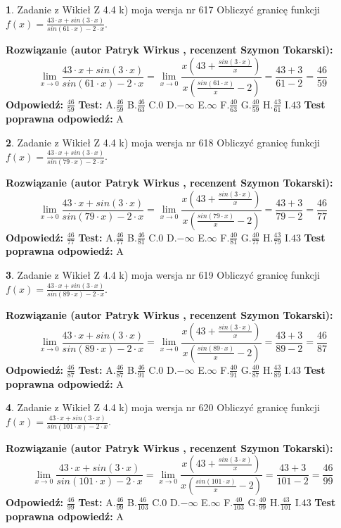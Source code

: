 \documentclass[12pt, a4paper]{article}
\theoremstyle{definition} %
\newtheorem{zad}{}
\newcommand{\zadStart}[1]{\begin{zad}#1\newline}
\newcommand{\zadStop}{\end{zad}}
\newcommand{\rozwStart}[2]{\noindent \textbf{Rozwiązanie (autor #1 , recenzent #2): }\newline}
\newcommand{\rozwStop}{\newline}
\newcommand{\odpStart}{\noindent \textbf{Odpowiedź:}\newline}
\newcommand{\odpStop}{\newline}
\newcommand{\testStart}{\noindent \textbf{Test:}\newline}
\newcommand{\testStop}{\newline}
\newcommand{\kluczStart}{\noindent \textbf{Test poprawna odpowiedź:}\newline}
\newcommand{\kluczStop}{\newline}
\begin{document}
\zadStart{Zadanie z Wikieł Z 4.4 k) moja wersja nr 617}
Obliczyć granicę funkcji $f(x)=\frac{43\cdot x +sin(3\cdot x)}{sin(61\cdot x) -2\cdot x}$.
\zadStop
\rozwStart{Patryk Wirkus}{Szymon Tokarski}
$$\lim\limits_{x\to 0}\frac{43\cdot x +sin(3\cdot x)}{sin(61\cdot x) -2\cdot x}
=\lim\limits_{x\to 0}\frac{x(43+\frac{sin(3\cdot x)}{x})}{x(\frac{sin(61\cdot x)}{x}-2)}
=\frac{43+3}{61-2} = \frac{46}{59}$$
\rozwStop
\odpStart
$\frac{46}{59}$
\odpStop
\testStart
A.$\frac{46}{59}$
B.$\frac{46}{63}$
C.$0$
D.$-\infty$
E.$\infty$
F.$\frac{40}{63}$
G.$\frac{40}{59}$
H.$\frac{43}{61}$
I.$43$
\testStop
\kluczStart
A
\kluczStop



\zadStart{Zadanie z Wikieł Z 4.4 k) moja wersja nr 618}
Obliczyć granicę funkcji $f(x)=\frac{43\cdot x +sin(3\cdot x)}{sin(79\cdot x) -2\cdot x}$.
\zadStop
\rozwStart{Patryk Wirkus}{Szymon Tokarski}
$$\lim\limits_{x\to 0}\frac{43\cdot x +sin(3\cdot x)}{sin(79\cdot x) -2\cdot x}
=\lim\limits_{x\to 0}\frac{x(43+\frac{sin(3\cdot x)}{x})}{x(\frac{sin(79\cdot x)}{x}-2)}
=\frac{43+3}{79-2} = \frac{46}{77}$$
\rozwStop
\odpStart
$\frac{46}{77}$
\odpStop
\testStart
A.$\frac{46}{77}$
B.$\frac{46}{81}$
C.$0$
D.$-\infty$
E.$\infty$
F.$\frac{40}{81}$
G.$\frac{40}{77}$
H.$\frac{43}{79}$
I.$43$
\testStop
\kluczStart
A
\kluczStop



\zadStart{Zadanie z Wikieł Z 4.4 k) moja wersja nr 619}
Obliczyć granicę funkcji $f(x)=\frac{43\cdot x +sin(3\cdot x)}{sin(89\cdot x) -2\cdot x}$.
\zadStop
\rozwStart{Patryk Wirkus}{Szymon Tokarski}
$$\lim\limits_{x\to 0}\frac{43\cdot x +sin(3\cdot x)}{sin(89\cdot x) -2\cdot x}
=\lim\limits_{x\to 0}\frac{x(43+\frac{sin(3\cdot x)}{x})}{x(\frac{sin(89\cdot x)}{x}-2)}
=\frac{43+3}{89-2} = \frac{46}{87}$$
\rozwStop
\odpStart
$\frac{46}{87}$
\odpStop
\testStart
A.$\frac{46}{87}$
B.$\frac{46}{91}$
C.$0$
D.$-\infty$
E.$\infty$
F.$\frac{40}{91}$
G.$\frac{40}{87}$
H.$\frac{43}{89}$
I.$43$
\testStop
\kluczStart
A
\kluczStop



\zadStart{Zadanie z Wikieł Z 4.4 k) moja wersja nr 620}
Obliczyć granicę funkcji $f(x)=\frac{43\cdot x +sin(3\cdot x)}{sin(101\cdot x) -2\cdot x}$.
\zadStop
\rozwStart{Patryk Wirkus}{Szymon Tokarski}
$$\lim\limits_{x\to 0}\frac{43\cdot x +sin(3\cdot x)}{sin(101\cdot x) -2\cdot x}
=\lim\limits_{x\to 0}\frac{x(43+\frac{sin(3\cdot x)}{x})}{x(\frac{sin(101\cdot x)}{x}-2)}
=\frac{43+3}{101-2} = \frac{46}{99}$$
\rozwStop
\odpStart
$\frac{46}{99}$
\odpStop
\testStart
A.$\frac{46}{99}$
B.$\frac{46}{103}$
C.$0$
D.$-\infty$
E.$\infty$
F.$\frac{40}{103}$
G.$\frac{40}{99}$
H.$\frac{43}{101}$
I.$43$
\testStop
\kluczStart
A
\kluczStop
\end{document}

